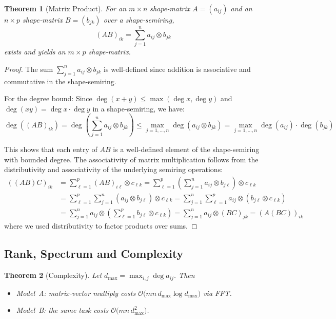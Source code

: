 \documentclass[11pt]{article}
\newtheorem{theorem}{Theorem}[section]
\begin{document}
\begin{theorem}[Matrix Product]
For an $m\times n$ shape‑matrix $A=(a_{ij})$ and an $n\times p$ shape‑matrix $B=(b_{jk})$ over a shape‑semiring,
\[(AB)_{ik}=\sum_{j=1}^{n} a_{ij}\otimes b_{jk}\] exists and yields an $m\times p$ shape‑matrix.
\end{theorem}
\begin{proof}
The sum $\sum_{j=1}^{n} a_{ij}\otimes b_{jk}$ is well-defined since addition is associative and commutative in the shape-semiring. 

For the degree bound: Since $\deg(x+y) \leq \max(\deg x, \deg y)$ and $\deg(xy) = \deg x \cdot \deg y$ in a shape-semiring, we have:
\[\deg((AB)_{ik}) = \deg\left(\sum_{j=1}^{n} a_{ij}\otimes b_{jk}\right) \leq \max_{j=1,\ldots,n} \deg(a_{ij}\otimes b_{jk}) = \max_{j=1,\ldots,n} \deg(a_{ij}) \cdot \deg(b_{jk})\]

This shows that each entry of $AB$ is a well-defined element of the shape-semiring with bounded degree. The associativity of matrix multiplication follows from the distributivity and associativity of the underlying semiring operations:
\begin{align}
((AB)C)_{ik} &= \sum_{\ell=1}^{p} (AB)_{i\ell} \otimes c_{\ell k} = \sum_{\ell=1}^{p} \left(\sum_{j=1}^{n} a_{ij} \otimes b_{j\ell}\right) \otimes c_{\ell k} \\
&= \sum_{\ell=1}^{p} \sum_{j=1}^{n} (a_{ij} \otimes b_{j\ell}) \otimes c_{\ell k} = \sum_{j=1}^{n} \sum_{\ell=1}^{p} a_{ij} \otimes (b_{j\ell} \otimes c_{\ell k}) \\
&= \sum_{j=1}^{n} a_{ij} \otimes \left(\sum_{\ell=1}^{p} b_{j\ell} \otimes c_{\ell k}\right) = \sum_{j=1}^{n} a_{ij} \otimes (BC)_{jk} = (A(BC))_{ik}
\end{align}
where we used distributivity to factor products over sums.
\qedhere
\end{proof}

\subsection{Rank, Spectrum and Complexity}
\begin{theorem}[Complexity]\label{thm:complexity}
Let $d_{\max}=\max_{i,j}\deg a_{ij}$.  Then
\begin{itemize}[leftmargin=1.5em]
  \item Model A: matrix‑vector multiply costs $\mathcal O\bigl(mn\,d_{\max}\log d_{\max}\bigr)$ via FFT.
  \item Model B: the same task costs $\mathcal O\bigl(mn\,d_{\max}^{2}\bigr)$.
\end{itemize}
\end{theorem}
\end{document}
